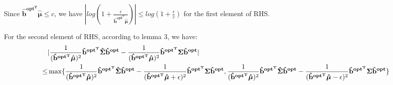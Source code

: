 \documentclass{gapd}
\begin{document}
Since $\mathbf{\hat{b}^{{opt}^T}} \boldsymbol{\hat{\mu}} \le c$, we have $|log(1+\frac{\epsilon}{\mathbf{\hat{b}^{{opt}^T}} \boldsymbol{\hat{\mu}}})| \le log(1+\frac{\epsilon}{c})$ for the first element of RHS.

For the second element of RHS, according to lemma 3, we have:
\begin{equation}
\begin{aligned}
&|\frac{1}{(\mathbf{\hat{b}^{{opt}^T}}\boldsymbol{\hat{\mu}})^2}\mathbf{\hat{b}^{{opt}^T}}\boldsymbol{\hat{\Sigma}}\mathbf{\hat{b}^{opt}}- \frac{1}{(\mathbf{\hat{b}^{{opt}^T}}\boldsymbol{\hat{\mu}})^2}\mathbf{\hat{b}^{{opt}^T}}\boldsymbol{\Sigma}\mathbf{\hat{b}^{opt}}|\\
\le& \max\{\frac{1}{(\mathbf{\hat{b}^{{opt}^T}}\boldsymbol{\hat{\mu}})^2}\mathbf{\hat{b}^{{opt}^T}}\boldsymbol{\hat{\Sigma}}\mathbf{\hat{b}^{opt}}-\frac{1}{(\mathbf{\hat{b}^{{opt}^T}}\boldsymbol{\hat{\mu}}+\epsilon)^2}\mathbf{\hat{b}^{{opt}^T}}\boldsymbol{\Sigma}\mathbf{\hat{b}^{opt}},\frac{1}{(\mathbf{\hat{b}^{{opt}^T}}\boldsymbol{\hat{\mu}})^2}\mathbf{\hat{b}^{{opt}^T}}\boldsymbol{\hat{\Sigma}}\mathbf{\hat{b}^{opt}}-\frac{1}{(\mathbf{\hat{b}^{{opt}^T}}\boldsymbol{\hat{\mu}}-\epsilon)^2}\mathbf{\hat{b}^{{opt}^T}}\boldsymbol{\Sigma}\mathbf{\hat{b}^{opt}}\}
\end{aligned}\notag
\end{equation}
\end{document}
